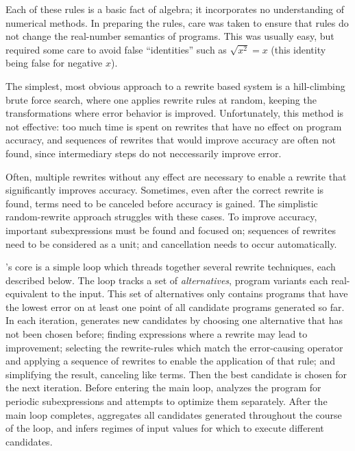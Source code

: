 \documentclass[paper.tex]{subfiles}
\begin{document}
Each of these rules is a basic fact of algebra;
  it incorporates no understanding of numerical methods.
In preparing the rules,
  care was taken to ensure that rules
  do not change the real-number semantics of programs.
This was usually easy, but required some care
  to avoid false ``identities'' such as $\sqrt{x^2} = x$
  (this identity being false for negative $x$).

The simplest, most obvious approach to a rewrite based system
  is a hill-climbing brute force search,
  where one applies rewrite rules at random,
  keeping the transformations where error behavior is improved.
Unfortunately, this method is not effective:
  too much time is spent on rewrites
  that have no effect on program accuracy,
  and sequences of rewrites that would improve accuracy
  are often not found, since intermediary steps do not neccessarily improve error.

Often, multiple rewrites without any effect
  are necessary to enable a rewrite that significantly improves accuracy.
Sometimes, even after the correct rewrite is found,
  terms need to be canceled before accuracy is gained.
The simplistic random-rewrite approach struggles with these cases.
To improve accuracy, important subexpressions
  must be found and focused on;
  sequences of rewrites need to be considered as a unit;
  and cancellation needs to occur automatically.

\casio's core is a simple loop
  which threads together several rewrite techniques,
  each described below.
The loop tracks a set of \emph{alternatives},
  program variants each real-equivalent to the input.
This set of alternatives only contains
  programs that have the lowest error on at least one point
  of all candidate programs generated so far.
In each iteration, \casio generates new candidates
  by choosing one alternative that has not been chosen before;
  finding expressions where a rewrite may lead to improvement;
  selecting the rewrite-rules which match the error-causing operator
  and applying a sequence of rewrites to enable the application of that rule;
  and simplifying the result, canceling like terms.
Then the best candidate is chosen for the next iteration.
Before entering the main loop,
  \casio analyzes the program for periodic subexpressions
  and attempts to optimize them separately.
After the main loop completes,
  \casio aggregates all candidates generated
  throughout the course of the loop,
  and infers regimes of input values for which
  to execute different candidates.
\end{document}
